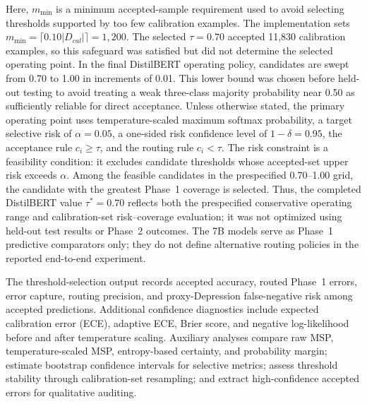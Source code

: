 \documentclass{ieeeaccess}
\begin{document}
Here, $m_{\min}$ is a minimum accepted-sample requirement used to avoid selecting thresholds supported by too few calibration examples. The implementation sets $m_{\min}=\lceil0.10|D_{cal}|\rceil=1{,}200$. The selected $\tau=0.70$ accepted 11,830 calibration examples, so this safeguard was satisfied but did not determine the selected operating point. In the final DistilBERT operating policy, candidates are swept from 0.70 to 1.00 in increments of 0.01. This lower bound was chosen before held-out testing to avoid treating a weak three-class majority probability near 0.50 as sufficiently reliable for direct acceptance. Unless otherwise stated, the primary operating point uses temperature-scaled maximum softmax probability, a target selective risk of $\alpha=0.05$, a one-sided risk confidence level of $1-\delta=0.95$, the acceptance rule $c_i \geq \tau$, and the routing rule $c_i < \tau$. The risk constraint is a feasibility condition: it excludes candidate thresholds whose accepted-set upper risk exceeds $\alpha$. Among the feasible candidates in the prespecified 0.70--1.00 grid, the candidate with the greatest Phase~1 coverage is selected. Thus, the completed DistilBERT value $\tau^*=0.70$ reflects both the prespecified conservative operating range and calibration-set risk--coverage evaluation; it was not optimized using held-out test results or Phase~2 outcomes. The 7B models serve as Phase~1 predictive comparators only; they do not define alternative routing policies in the reported end-to-end experiment.

The threshold-selection output records accepted accuracy, routed Phase~1 errors, error capture, routing precision, and proxy-Depression false-negative risk among accepted predictions. Additional confidence diagnostics include expected calibration error (ECE), adaptive ECE, Brier score, and negative log-likelihood before and after temperature scaling. Auxiliary analyses compare raw MSP, temperature-scaled MSP, entropy-based certainty, and probability margin; estimate bootstrap confidence intervals for selective metrics; assess threshold stability through calibration-set resampling; and extract high-confidence accepted errors for qualitative auditing.
\end{document}
